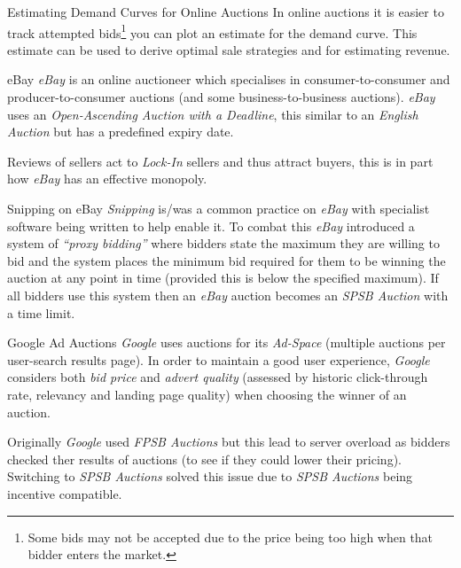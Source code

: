 \documentclass[11pt,a4paper]{article}
\begin{document}
  \begin{remark}{Estimating Demand Curves for Online Auctions}
    In online auctions it is easier to track attempted bids\footnote{Some bids may not be accepted due to the price being too high when that bidder enters the market.} you can plot an estimate for the demand curve. This estimate can be used to derive optimal sale strategies and for estimating revenue.
  \end{remark}

  \begin{remark}{eBay}
    \textit{eBay} is an online auctioneer which specialises in consumer-to-consumer and producer-to-consumer auctions (and some business-to-business auctions). \textit{eBay} uses an \textit{Open-Ascending Auction with a Deadline}, this similar to an \textit{English Auction} but has a predefined expiry date.
    \par Reviews of sellers act to \textit{Lock-In} sellers and thus attract buyers, this is in part how \textit{eBay} has an effective monopoly.
  \end{remark}

  \begin{remark}{Snipping on eBay}
    \textit{Snipping} is/was a common practice on \textit{eBay} with specialist software being written to help enable it. To combat this \textit{eBay} introduced a system of \textit{``proxy bidding''} where bidders state the maximum they are willing to bid and the system places the minimum bid required for them to be winning the auction at any point in time (provided this is below the specified maximum). If all bidders use this system then an \textit{eBay} auction becomes an \textit{SPSB Auction} with a time limit.
  \end{remark}

  \begin{remark}{Google Ad Auctions}
    \textit{Google} uses auctions for its \textit{Ad-Space} (multiple auctions per user-search results page). In order to maintain a good user experience, \textit{Google} considers both \textit{bid price} and \textit{advert quality} (assessed by historic click-through rate, relevancy and landing page quality) when choosing the winner of an auction.
    \par Originally \textit{Google} used \textit{FPSB Auctions} but this lead to server overload as bidders checked ther results of auctions (to see if they could lower their pricing). Switching to \textit{SPSB Auctions} solved this issue due to \textit{SPSB Auctions} being incentive compatible.
  \end{remark}
\end{document}
